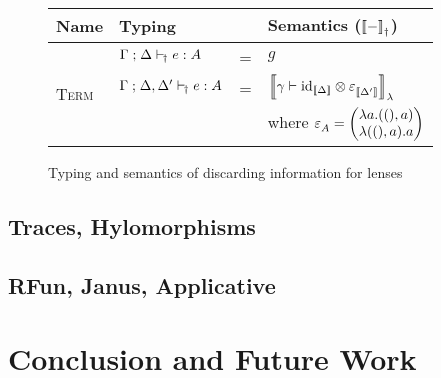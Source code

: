 \documentclass[runningheads,envcountsame]{llncs}
\begin{document}
    \begin{figure}
        
        {\centering
        \def\arraystretch{1.5}
        \begin{tabular}{l|l c l}
              Name & Typing & & Semantics ($\semD{-}$) \\
              \hline\hline
              \multirow{3}{*}{\textsc{Term}}
            & $\Gamma \mathrel{;} \Delta \vdash_{\!\dagger} e : A$
            & = & $g$ \\ \cline{2-2}
            & $\Gamma \mathrel{;} \Delta,\Delta' \vdash_{\!\dagger} e : A$
            & = & $\semL{\gamma \vdash \tensor{\id_{\sem{\Delta}}}{\terminal_{\sem{\Delta'}}}}$ \\
            & & & \hfill where $\terminal_A = \janus{\lambda a. ((), a)}{\lambda ((), a). a}$
            \\ \hline
        \end{tabular}}
        \caption{Typing and semantics of discarding information for lenses}
        \label{fig:lens-terminal}
    \end{figure}
    
    \subsection{Traces, Hylomorphisms}
    
    \subsection{RFun, Janus, Applicative}
    
    \section{Conclusion and Future Work}

    
\end{document}
